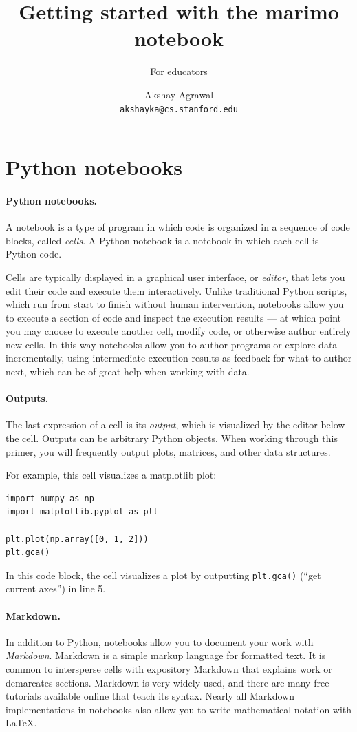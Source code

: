 \documentclass{article}
\title{Getting started with the marimo notebook}
\subtitle{For educators}
\author{Akshay Agrawal \\ \texttt{akshayka@cs.stanford.edu}}
\date{}
\begin{document}
\maketitle
\tableofcontents

\section{Python notebooks}

\paragraph{Python notebooks.} A notebook is a type of program in which code is
organized in a sequence of code blocks, called \emph{cells}.
A Python notebook is a notebook in which each cell is Python code.

Cells are typically displayed in a graphical user interface, or \emph{editor}, that
lets you edit their code and execute them interactively. Unlike traditional
Python scripts, which run from start to finish without human intervention,
notebooks allow you to execute a section of code and inspect the execution
results — at which point you may choose to execute another cell, modify 
code, or otherwise author entirely new cells. In this way notebooks allow you
to author programs or explore data incrementally, using intermediate execution
results as feedback for what to author next, which can be of great help when
working with data.

\paragraph{Outputs.} The last expression of a cell is its \emph{output}, which
is visualized by the editor below the cell. Outputs can be arbitrary Python
objects. When working through this primer, you will frequently output
plots, matrices, and other data structures.

For example, this cell visualizes a matplotlib plot:

\begin{lstlisting}
import numpy as np
import matplotlib.pyplot as plt

plt.plot(np.array([0, 1, 2]))
plt.gca()
\end{lstlisting}
In this code block, the cell visualizes a plot by outputting \verb|plt.gca()|
(``get current axes'') in line 5.

\paragraph{Markdown.} In addition to Python, notebooks allow you to document
your work with \emph{Markdown}. Markdown is a simple markup language for
formatted text. It is common to intersperse cells with expository
Markdown that explains work or demarcates sections. Markdown is
very widely used, and there are many free tutorials available online that
teach its syntax. Nearly all Markdown implementations in notebooks also allow
you to write mathematical notation with \LaTeX.
\end{document}
